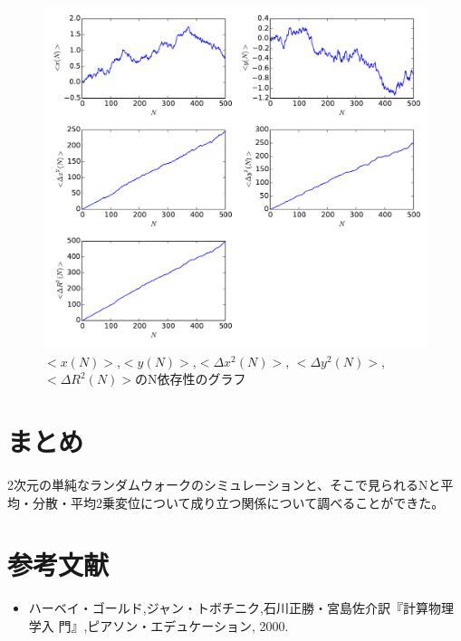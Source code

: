\documentclass{jsarticle}
\begin{document}
\begin{enumerate}
\begin{enumerate}
                    \begin{figure}[H]
                        \begin{center}
                            \includegraphics[width=12.5cm]{figure_2.pdf}
                            \caption{$<x(N)>$,$<y(N)>$,$<\Delta x^{2}(N)>$, $<\Delta y^{2}(N)>$,$<\Delta R^{2}(N)>$のN依存性のグラフ}
                            \label{fig:f4}
                        \end{center}
                    \end{figure}
                \end{enumerate} 
            
        \end{enumerate}
    
    \section{まとめ}
        2次元の単純なランダムウォークのシミュレーションと、そこで見られるNと平均・分散・平均2乗変位について成り立つ関係について調べることができた。
    \section{参考文献}
        \begin{itemize}
            \item ハーベイ・ゴールド,ジャン・トボチニク,石川正勝・宮島佐介訳『計算物理学入
            門』,ピアソン・エデュケーション, 2000.
        \end{itemize}
\end{document}

